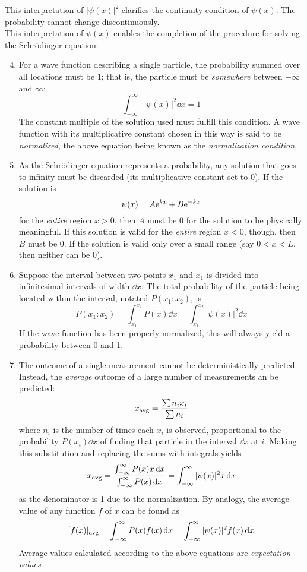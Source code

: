 \documentclass{subfiles}
\begin{document}
			This interpretation of \(|\psi(x)|^2\) clarifies the continuity condition of \(\psi(x)\). The probability cannot change discontinuously. \\
			This interpretation of \(\psi(x)\) enables the completion of the procedure for solving the Schr\"odinger equation:
			\begin{enumerate}
				\setcounter{enumi}{3}
				\item
					For a wave function describing a single particle, the probability summed over all locations must be 1; that is, the particle must be \textit{somewhere} between \(-\infty\) and \(\infty\):
					\[\int_{-\infty}^\infty |\psi(x)|^2 \dd{x} = 1\]
					The constant multiple of the solution used must fulfill this condition. A wave function with its multiplicative constant chosen in this way is said to be \textit{normalized}, the above equation being known as the \textit{normalization condition}.
				\item
					As the Schr\"odinger equation represents a probability, any solution that goes to infinity must be discarded (its multiplicative constant set to 0). If the solution is
						\[\psi(x) = A\text{e}^{kx} + B\text{e}^{-kx}\]
						for the \textit{entire} region \(x > 0\), then \(A\) must be 0 for the solution to be physically meaningful. If this solution is valid for the \textit{entire} region \(x < 0\), though, then \(B\) must be 0. If the solution is valid only over a small range (say \(0 < x < L\), then neither can be 0).
				\item
					Suppose the interval between two points \(x_1\) and \(x_1\) is divided into infinitesimal intervals of width \(\dd{x}\). The total probability of the particle being located within the interval, notated \(P(x_1:x_2)\), is 
						\[
							P(x_1:x_2) = \int_{x_1}^{x_2} P(x) \dd{x}
								= \int_{x_1}^{x_2} |\psi(x)|^2 \dd{x}
						\]
						If the wave function has been properly normalized, this will always yield a probability between 0 and 1.
				\item
					The outcome of a single measurement cannot be deterministically predicted. Instead, the \textit{average} outcome of a large number of measurements an be predicted:
						\[x_{\text{avg}} = \frac{\sum n_ix_i}{\sum n_i}\]
						where \(n_i\) is the number of times each \(x_i\) is observed, proportional to the probability \(P(x_i)\dd{x}\) of finding that particle in the interval \(\dd{x}\) at \(i\). Making this substitution and replacing the sums with integrals yields
						\[
							x_{\text{avg}} = \frac{\int_{-\infty}^\infty P(x)x \dd{x}}{\int_{-\infty}^\infty P(x) \dd{x}}
								= \int_{-\infty}^\infty |\psi(x)|^2x \dd{x}
						\]
						as the denominator is 1 due to the normalization. By analogy, the average value of any function \(f\) of \(x\) can be found as
						\[
							[f(x)]_{\text{avg}} = \int_{-\infty}^\infty P(x)f(x) \dd{x}
								= \int_{-\infty}^\infty |\psi(x)|^2f(x) \dd{x}
						\]
						Average values calculated according to the above equations are \textit{expectation values}.
			\end{enumerate}
\end{document}
